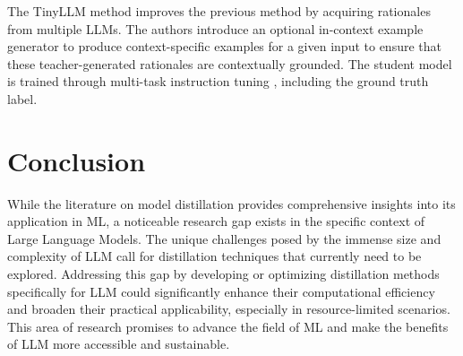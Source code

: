 The TinyLLM method \cite{tinyllm} improves the previous method by acquiring rationales from multiple LLMs. The authors introduce an optional in-context example generator to produce context-specific examples for a given input to ensure that these teacher-generated rationales are contextually grounded. The student model is trained through multi-task instruction tuning \cite{t5,t0}, including the ground truth label.

\section*{Conclusion}

While the literature on model distillation provides comprehensive insights into its application in ML, a noticeable research gap exists in the specific context of Large Language Models. The unique challenges posed by the immense size and complexity of LLM call for distillation techniques that currently need to be explored. Addressing this gap by developing or optimizing distillation methods specifically for LLM could significantly enhance their computational efficiency and broaden their practical applicability, especially in resource-limited scenarios. This area of research promises to advance the field of ML and make the benefits of LLM more accessible and sustainable.
